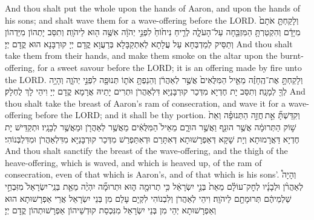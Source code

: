 {{And thou shalt put the whole upon the hands of Aaron, and upon the hands of his sons; and shalt wave them for a wave-offering before the LORD.}{}
{וְלָקַחְתָּ֤ אֹתָם֙ מִיָּדָ֔ם וְהִקְטַרְתָּ֥ הַמִּזְבֵּ֖חָה עַל־הָעֹלָ֑ה לְרֵ֤יחַ נִיח֙וֹחַ֙ לִפְנֵ֣י יְהֹוָ֔ה אִשֶּׁ֥ה ה֖וּא לַיהֹוָֽה׃
}
{וְתִסַּב יָתְהוֹן מִיַּדְהוֹן וְתַסֵּיק לְמַדְבְּחָא עַל עֲלָתָא לְאִתְקַבָּלָא בְּרַעֲוָא קֳדָם יְיָ קוּרְבָּנָא הוּא קֳדָם יְיָ׃}
{And thou shalt take them from their hands, and make them smoke on the altar upon the burnt-offering, for a sweet savour before the LORD; it is an offering made by fire unto the LORD.}{}
{וְלָקַחְתָּ֣ אֶת־הֶֽחָזֶ֗ה מֵאֵ֤יל הַמִּלֻּאִים֙ אֲשֶׁ֣ר לְאַהֲרֹ֔ן וְהֵנַפְתָּ֥ אֹת֛וֹ תְּנוּפָ֖ה לִפְנֵ֣י יְהֹוָ֑ה וְהָיָ֥ה לְךָ֖ לְמָנָֽה׃}
{וְתִסַּב יָת חֶדְיָא מִדְּכַר קוּרְבָּנַיָּא דִּלְאַהֲרֹן וּתְרִים יָתֵיהּ אֲרָמָא קֳדָם יְיָ וִיהֵי לָךְ לֻחְלָק׃}
{And thou shalt take the breast of Aaron’s ram of consecration, and wave it for a wave-offering before the LORD; and it shall be thy portion.}{}
{וְקִדַּשְׁתָּ֞ אֵ֣ת \legarmeh  חֲזֵ֣ה הַתְּנוּפָ֗ה וְאֵת֙ שׁ֣וֹק הַתְּרוּמָ֔ה אֲשֶׁ֥ר הוּנַ֖ף וַאֲשֶׁ֣ר הוּרָ֑ם מֵאֵיל֙ הַמִּלֻּאִ֔ים מֵאֲשֶׁ֥ר לְאַהֲרֹ֖ן וּמֵאֲשֶׁ֥ר לְבָנָֽיו׃
}
{וּתְקַדֵּישׁ יָת חֶדְיָא דַּאֲרָמוּתָא וְיָת שָׁקָא דְּאַפְרָשׁוּתָא דְּאִתָּרַם וּדְאִתַּפְרַשׁ מִדְּכַר קוּרְבָּנַיָּא מִדִּלְאַהֲרֹן וּמִדִּלְבְּנוֹהִי׃}
{And thou shalt sanctify the breast of the wave-offering, and the thigh of the heave-offering, which is waved, and which is heaved up, of the ram of consecration, even of that which is Aaron’s, and of that which is his sons’.}{}
{וְהָיָה֩ לְאַהֲרֹ֨ן וּלְבָנָ֜יו לְחׇק־עוֹלָ֗ם מֵאֵת֙ בְּנֵ֣י יִשְׂרָאֵ֔ל כִּ֥י תְרוּמָ֖ה ה֑וּא וּתְרוּמָ֞ה יִהְיֶ֨ה מֵאֵ֤ת בְּנֵֽי־יִשְׂרָאֵל֙ מִזִּבְחֵ֣י שַׁלְמֵיהֶ֔ם תְּרוּמָתָ֖ם לַיהֹוָֽה׃
}
{וִיהֵי לְאַהֲרֹן וְלִבְנוֹהִי לִקְיָם עָלַם מִן בְּנֵי יִשְׂרָאֵל אֲרֵי אַפְרָשׁוּתָא הוּא וְאַפְרָשׁוּתָא יְהֵי מִן בְּנֵי יִשְׂרָאֵל מִנִּכְסַת קוּדְשֵׁיהוֹן אַפְרָשׁוּתְהוֹן קֳדָם יְיָ׃}
}
